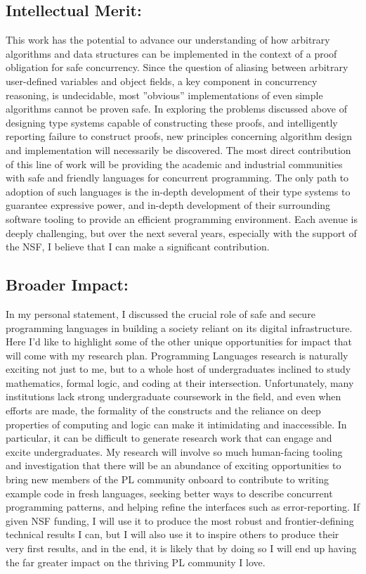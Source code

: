 \documentclass{nsf-grfp}
\begin{document}
\subsection*{Intellectual Merit:} This work has the potential to advance our understanding of how arbitrary algorithms and data structures can be implemented in the context of a proof obligation for safe concurrency. Since the question of aliasing between arbitrary user-defined variables and object fields, a key component in concurrency reasoning, is undecidable, most ''obvious'' implementations of even simple algorithms cannot be proven safe. In exploring the problems discussed above of designing type systems capable of constructing these proofs, and intelligently reporting failure to construct proofs, new principles concerning algorithm design and implementation will necessarily be discovered. The most direct contribution of this line of work will be providing the academic and industrial communities with safe and friendly languages for concurrent programming. The only path to adoption of such languages is the in-depth development of their type systems to guarantee expressive power, and in-depth development of their surrounding software tooling to provide an efficient programming environment. Each avenue is deeply challenging, but over the next several years, especially with the support of the NSF, I believe that I can make a significant contribution.

\subsection*{Broader Impact:} In my personal statement, I discussed the crucial role of safe and secure programming languages in building a society reliant on its digital infrastructure. Here I'd like to highlight some of the other unique opportunities for impact that will come with my research plan. Programming Languages research is naturally exciting not just to me, but to a whole host of undergraduates inclined to study mathematics, formal logic, and coding at their intersection. Unfortunately, many institutions lack strong undergraduate coursework in the field, and even when efforts are made, the formality of the constructs and the reliance on deep properties of computing and logic can make it intimidating and inaccessible. In particular, it can be difficult to generate research work that can engage and excite undergraduates. My research will involve so much human-facing tooling and investigation that there will be an abundance of exciting opportunities to bring new members of the PL community onboard to contribute to writing example code in fresh languages, seeking better ways to describe concurrent programming patterns, and helping refine the interfaces such as error-reporting. If given NSF funding, I will use it to produce the most robust and frontier-defining technical results I can, but I will also use it to inspire others to produce their very first results, and in the end, it is likely that by doing so I will end up having the far greater impact on the thriving PL community I love.
\end{document}
